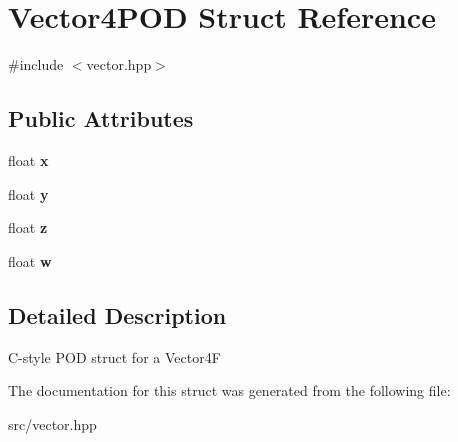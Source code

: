 \hypertarget{struct_vector4_p_o_d}{}\section{Vector4\+P\+OD Struct Reference}
\label{struct_vector4_p_o_d}


{\ttfamily \#include $<$vector.\+hpp$>$}

\subsection*{Public Attributes}
\begin{DoxyCompactItemize}
\item 
\mbox{\label{struct_vector4_p_o_d_a0a0ef8c9a27e473ae8e2c0efd0e15cfa}} 
float {\bfseries x}
\item 
\mbox{\label{struct_vector4_p_o_d_af4520f03d79619dd11ec032720292a36}} 
float {\bfseries y}
\item 
\mbox{\label{struct_vector4_p_o_d_a057be9df17dcb0d5433e79d451ecea2d}} 
float {\bfseries z}
\item 
\mbox{\label{struct_vector4_p_o_d_a4d2328ef400928e608235529d43a7a40}} 
float {\bfseries w}
\end{DoxyCompactItemize}


\subsection{Detailed Description}
C-\/style P\+OD struct for a Vector4F 

The documentation for this struct was generated from the following file\+:\begin{DoxyCompactItemize}
\item 
src/vector.\+hpp\end{DoxyCompactItemize}
